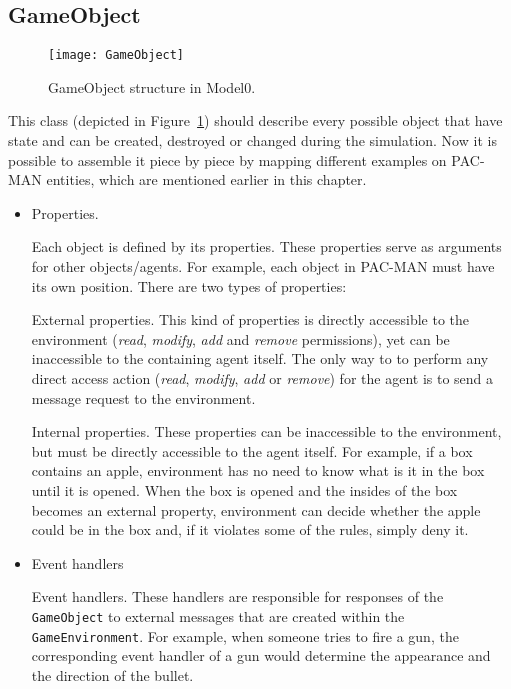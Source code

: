 \subsection{GameObject}
 \begin{figure}[p]
    \begin{center}
      \texttt{[image: GameObject]}
      \caption{GameObject structure in Model0.}
      \label{GameObj}
     \end{center}
    \end{figure}
This class (depicted in Figure~\ref{GameObj}) should describe every possible object that have state and can be created, destroyed or changed during the simulation.
Now it is possible to assemble it piece by piece by mapping different examples on PAC-MAN entities, which are mentioned earlier in this chapter.
\begin{itemize}
\item Properties. \par
Each object is defined by its properties.
These properties serve as arguments for other objects/agents. For example, each object in PAC-MAN must have its own position. There are two types of properties:
\begin{definition}{External properties}. This kind of properties is directly accessible to the environment (\textit{read}, \textit{modify}, \textit{add} and \textit{remove} permissions), yet can be inaccessible to the containing agent itself. The only way to to perform any direct access action (\textit{read}, \textit{modify}, \textit{add} or \textit{remove}) for the agent is to send a message request to the environment.
 \end{definition}
\begin{definition}{Internal properties.} These properties can be inaccessible to the environment, but must be directly accessible to the agent itself. For example, if a box contains an apple, environment has no need to know what is it in the box until it is opened. When the box is opened and the insides of the box becomes an external property, environment can decide whether the apple could be in the box and, if it violates some of the rules, simply deny it.
 \end{definition}
\item Event handlers
\begin{definition}{Event handlers.} 
These handlers are responsible for responses of the \texttt{GameObject} to external messages that are created within the \texttt{GameEnvironment}. For example, when someone tries to fire a gun, the corresponding event handler of a gun would determine the appearance and the direction of the bullet.
\end{definition}
\end{itemize}
